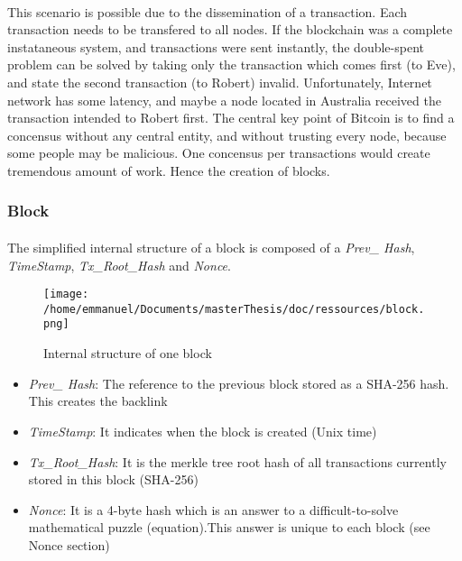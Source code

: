 \paragraph{}
This scenario is possible due to the dissemination of a transaction. Each transaction needs to be transfered to all nodes. If the blockchain was a complete instataneous system, and transactions were sent instantly, the double-spent problem can be solved by taking only the transaction which comes first (to Eve), and state the second transaction (to Robert) invalid. Unfortunately, Internet network has some latency, and maybe a node located in Australia received the transaction intended to Robert first. The central key point of Bitcoin is to find a concensus without any central entity, and without trusting every node, because some people may be malicious. One concensus per transactions would create tremendous amount of work. Hence the creation of blocks.   

\subsubsection{Block}
\paragraph{}
The simplified internal structure of a block is composed of a \emph{Prev\_ Hash}, \emph{TimeStamp}, \emph{Tx\_Root\_Hash} and \emph{Nonce}. 

\begin{figure}[htp]
\centering
\texttt{[image: /home/emmanuel/Documents/masterThesis/doc/ressources/block.png]}
\caption{Internal structure of one block}
\label{}
\end{figure}

\begin{itemize}
  \setlength\itemsep{0em}

  \item \emph{Prev\_ Hash}: The reference to the previous block stored as a SHA-256 hash. This creates the backlink
  \item \emph{TimeStamp}: It indicates when the block is created (Unix time)
  \item \emph{Tx\_Root\_Hash}: It is the merkle tree root hash of all transactions currently stored in this block (SHA-256)
  \item \emph{Nonce}: It is a 4-byte hash which is an answer to a difficult-to-solve mathematical puzzle (equation).This answer is unique to each block (see Nonce section) 

\end{itemize}

